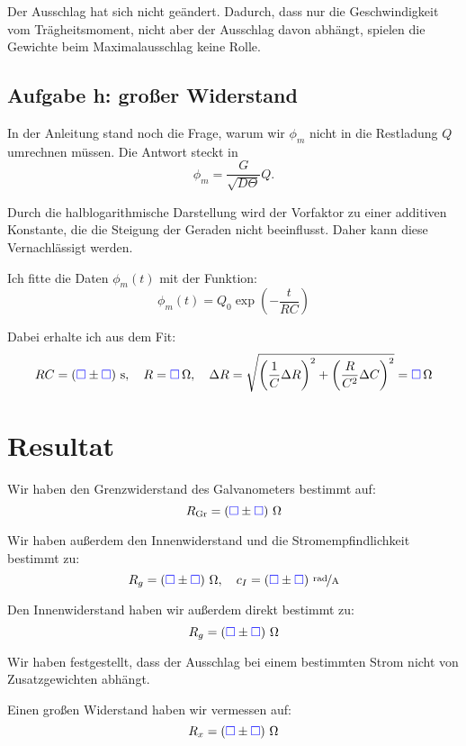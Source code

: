 \documentclass[11pt, ngerman]{article}
\newcommand{\emesswert}{\left(\messwert \pm \messwert \right)}
\newcommand{\messwert}{\textcolor{blue}{\square}}
\begin{document}
Der Ausschlag hat sich nicht geändert. Dadurch, dass nur die Geschwindigkeit
vom Trägheitsmoment, nicht aber der Ausschlag davon abhängt, spielen die
Gewichte beim Maximalausschlag keine Rolle.

\subsection{Aufgabe h: großer Widerstand}

In der Anleitung stand noch die Frage, warum wir $\phi_m$ nicht in die
Restladung $Q$ umrechnen müssen. Die Antwort steckt in
\[ \phi_m = \frac{G}{\sqrt{D \Theta}} Q. \]

Durch die halblogarithmische Darstellung wird der Vorfaktor zu einer additiven
Konstante, die die Steigung der Geraden nicht beeinflusst. Daher kann diese
Vernachlässigt werden.

Ich fitte die Daten $\phi_m(t)$ mit der Funktion:
\[ \phi_m(t) = Q_0 \exp \left( - \frac{t}{RC} \right) \]

Dabei erhalte ich aus dem Fit:
\[
	RC = \unit[\emesswert] s
	, \quad
	R = \unit[\messwert] \Omega
	, \quad
	\Delta R = \sqrt{
		\left( \frac{1}{C} \Delta R \right)^2
		+ \left( \frac{R}{C^2} \Delta C \right)^2
	} = \unit[\messwert] \Omega
\]


\section{Resultat}

Wir haben den Grenzwiderstand des Galvanometers bestimmt auf:
\[ R_\text{Gr} = \unit[\emesswert] \Omega \]

Wir haben außerdem den Innenwiderstand und die Stromempfindlichkeit bestimmt
zu:
\[
	R_g = \unit[\emesswert] \Omega
	, \quad
	c_I = \unitfrac[\emesswert]{rad}{A}
\]

Den Innenwiderstand haben wir außerdem direkt bestimmt zu:
\[ R_g = \unit[\emesswert] \Omega \]

Wir haben festgestellt, dass der Ausschlag bei einem bestimmten Strom nicht von
Zusatzgewichten abhängt.

Einen großen Widerstand haben wir vermessen auf:
\[ R_x = \unit[\emesswert] \Omega \]
\end{document}
